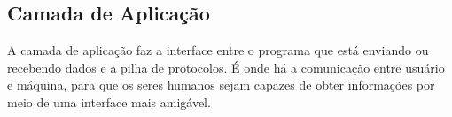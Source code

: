 
\subsection{Camada de Aplicação}

A camada de aplicação faz a interface entre o programa que está enviando ou recebendo dados e a pilha de protocolos. É onde há a comunicação entre usuário e máquina, para que os seres humanos sejam capazes de obter informações por meio de uma interface mais amigável.

